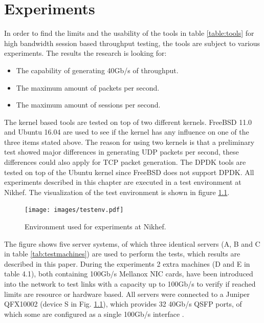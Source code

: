 \chapter{Experiments}\label{ch:experiments}
In order to find the limits and the usability of the tools in table \ref{table:tools} for high bandwidth session based throughput testing, the tools are subject to various experiments.
The results the research is looking for: 
\begin{itemize}
\item{The capability of generating 40Gb/s of throughput.} 
\item{The maximum amount of packets per second.} 
\item{The maximum amount of sessions per second.}
\end{itemize}

The kernel based tools are tested on top of two different kernels. 
FreeBSD 11.0 and Ubuntu 16.04 are used to see if the kernel has any influence on one of the three items stated above.
The reason for using two kernels is that a preliminary test showed major differences in generating UDP packets per second, these differences could also apply for TCP packet generation.  
The DPDK tools are tested on top of the Ubuntu kernel since FreeBSD does not support DPDK.
All experiments described in this chapter are executed in a test environment at Nikhef. The visualization of the test environment is shown in figure \ref{fig:testenv}. \\ 

\begin{figure}[H]
  \texttt{[image: images/testenv.pdf]}
  \caption{Environment used for experiments at Nikhef.}
  \label{fig:testenv}
\end{figure}

The figure shows five server systems, of which three identical servers (A, B and C in table \ref{tab:testmachines}) are used to perform the tests, which results are described in this paper.
During the experiments 2 extra machines (D and E in table 4.1), both containing 100Gb/s Mellanox NIC cards, have been introduced into the network to test links with a capacity up to 100Gb/s to verify if reached limits are resource or hardware based. All servers were connected to a Juniper QFX10002 (device S in Fig. \ref{fig:testenv}), which provides 32 40Gb/s QSFP ports, of which some are configured as a single 100Gb/s interface \cite{pic100g}.

